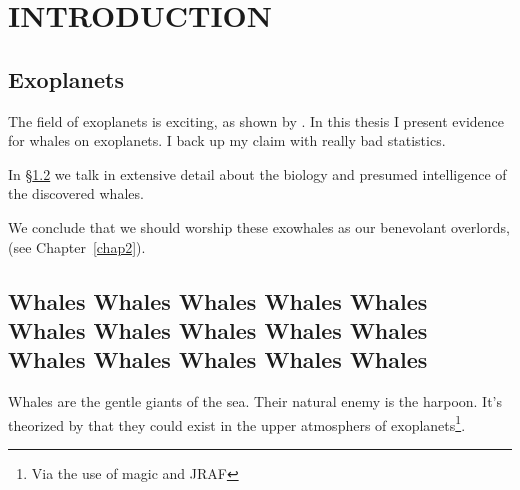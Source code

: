 \label{chap1}
\section{\MakeUppercase{Introduction}}

\subsection{Exoplanets}
\label{introsec}

The field of exoplanets is exciting, as shown by \citet{Borucki2011}. In this thesis I present evidence for whales on exoplanets. I back up my claim with really bad statistics.

In \S\ref{whalesec} we talk in extensive detail about the biology and presumed intelligence of the discovered whales.

We conclude that we should worship these exowhales as our benevolant overlords, (see Chapter~\ref{chap2}).


\subsection{Whales Whales Whales Whales Whales Whales Whales Whales Whales Whales Whales Whales Whales Whales Whales }
\label{whalesec}

Whales are the gentle giants of the sea. Their natural enemy is the harpoon. It's theorized by \citet{Coughlin2008} that they could exist in the upper atmosphers of exoplanets\footnote{Via the use of magic and JRAF}.



